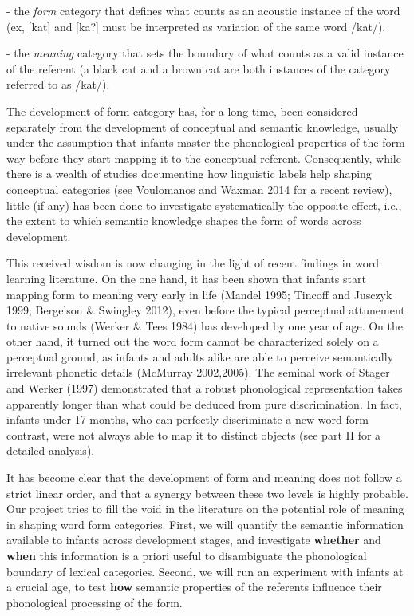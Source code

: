 \documentclass[12pt]{article}
\begin{document}
- the \textit{form} category that defines what counts as an acoustic instance of the word (ex, [kat] and [ka?] must be interpreted as variation of the same word /kat/).

- the \textit{meaning} category that sets the boundary of what counts as a valid instance of the referent (a black cat and a brown cat are both instances of the category referred to as /kat/).

The development of form category has, for a long time, been considered separately from the development of conceptual and semantic knowledge, usually under the assumption that infants master the phonological properties of the form way before they start mapping it to the conceptual referent.  Consequently, while there is a wealth of studies documenting how linguistic labels help shaping conceptual categories (see Voulomanos and Waxman 2014 for a recent review), little (if any) has been done to investigate systematically the opposite effect, i.e., the extent to which semantic knowledge shapes the form of words across development. 

This received wisdom is now changing in the light of recent findings in word learning literature. On the one hand, it has been shown that infants start mapping form to meaning very early in life (Mandel 1995; Tincoff and Jusczyk 1999; Bergelson \& Swingley 2012), even before the typical perceptual attunement to native sounds (Werker \& Tees 1984) has developed by one year of age.  On the other hand,  it turned out the word form cannot be characterized solely on a perceptual ground, as infants and adults alike are able to perceive semantically irrelevant phonetic details (McMurray 2002,2005).  The seminal work of Stager and Werker (1997) demonstrated that a robust phonological representation takes apparently longer than what could be deduced from pure discrimination. In fact, infants under 17 months, who can perfectly discriminate a new word form contrast, were not always able to map it to distinct objects (see part II for a detailed analysis). 

It has become clear that the development of form and meaning does not follow a strict linear order, and that a synergy between these two levels is highly probable. Our project tries to fill the void in the literature on the potential role of meaning in shaping word form categories. 
First, we will quantify the semantic information available to infants across development stages, and investigate \textbf{whether} and \textbf{when} this information is a priori useful to disambiguate the phonological boundary of lexical categories. Second, we will run an experiment with infants at a crucial age, to test \textbf{how} semantic properties of the referents influence their phonological processing of the form.
\end{document}
